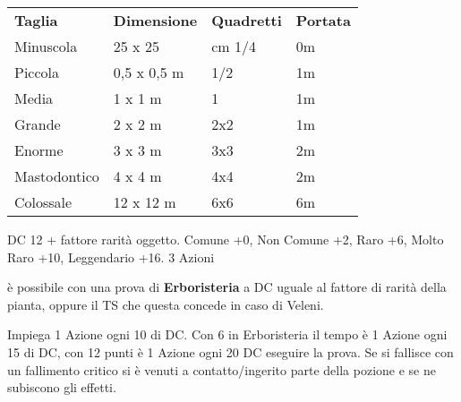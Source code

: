 \documentclass[landscape,10pt,a4paper]{article}
\begin{document}
\begin{multicols}{3}
\begin{dmbox}[title=Cavalcature/Costo/Movimento - pagina \pageref{costicavalcature} - \pageref{tabella-cavalcature-e-veicoli} - \pageref{tipodimovimento}]
\end{dmbox}

\begin{dmbox}[title=Taglia e Portata standard - pagina \pageref{tagliaeportata}]
\begin{tabularx}{0.95\linewidth}{llll}
\toprule
\textbf{Taglia}& \textbf{Dimensione} &\textbf{Quadretti}&\textbf{Portata}\\
Minuscola & 25 x 25 &cm 1/4&0m\\
Piccola & 0,5 x 0,5 m & 1/2&1m\\
Media & 1 x 1 m & 1&1m\\
Grande & 2 x 2 m& 2x2&1m\\
Enorme & 3 x 3 m & 3x3&2m\\
Mastodontico & 4 x 4 m&4x4&2m\\
Colossale & 12 x 12 m&6x6&6m
\end{tabularx}
\end{dmbox}






\begin{dmbox}[title=Valutare - pagina \pageref{valutare}]
DC 12 + fattore rarità oggetto. Comune +0, Non Comune +2, Raro +6, Molto Raro +10, Leggendario +16. 3 Azioni
\end{dmbox}

\begin{dmbox}[title=Identificare una pozione o veleno naturale - pagina \pageref{identificarepozioni}]
	è possibile con una prova di \textbf{Erboristeria} a DC uguale al fattore di rarità della pianta, oppure il TS che questa concede in caso di Veleni.
	
	Impiega 1 Azione ogni 10 di DC. Con 6 in Erboristeria il tempo è 1 Azione ogni 15 di DC, con 12 punti è 1 Azione ogni 20 DC eseguire la prova. Se si fallisce con un fallimento critico si è venuti a contatto/ingerito parte della pozione e se ne subiscono gli effetti.
\end{dmbox}




\end{multicols}
\end{document}
